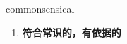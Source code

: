 
\begin{frame}
{\huge commonsensical}
\begin{center}
\begin{enumerate}\Large
  \item \textbf{符合常识的，有依据的}
\end{enumerate}
\end{center}
\end{frame}
